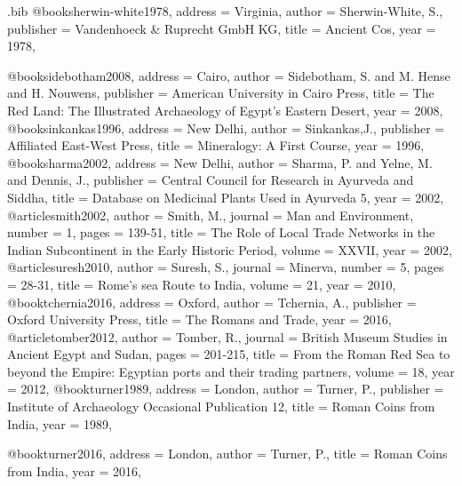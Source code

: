 \begin{filecontents}{\IJSRAidentifier.bib}
@book{sherwin-white1978,
	address = {Virginia},
	author = {Sherwin-White, S.},
	publisher = {Vandenhoeck \& Ruprecht GmbH KG},
	title = {Ancient Cos},
	year = {1978},
}

@book{sidebotham2008,
	address = {Cairo},
	author = {Sidebotham, S. and M. Hense and H. Nouwens},
	publisher = {American University in Cairo Press},
	title = {The Red Land: The Illustrated Archaeology of Egypt's Eastern Desert},
	year = {2008},
}
@book{sinkankas1996,
	address = {New Delhi},
	author = {Sinkankas,J.},
	publisher = {Affiliated East-West Press},
	title = {Mineralogy: A First Course},
	year = {1996},
}
@book{sharma2002,
	address = {New Delhi},
	author = {Sharma, P. and Yelne, M. and Dennis, J.},
	publisher = {Central Council for Research in Ayurveda and Siddha},
	title = {Database on Medicinal Plants Used in Ayurveda 5},
	year = {2002},
}
@article{smith2002,
	author = {Smith, M.},
	journal = {Man and Environment},
	number = {1},
	pages = {139-51},
	title = {The Role of Local Trade Networks in the Indian Subcontinent in the Early Historic Period},
	volume = {XXVII},
	year = {2002},
}
@article{suresh2010,
	author = {Suresh, S.},
	journal = {Minerva},
	number = {5},
	pages = {28-31},
	title = {Rome's sea Route to India},
	volume = {21},
	year = {2010},
}
@book{tchernia2016,
	address = {Oxford},
	author = {Tchernia, A.},
	publisher = {Oxford University Press},
	title = {The Romans and Trade},
	year = {2016},
}
@article{tomber2012,
	author = {Tomber, R.},
	journal = {British Museum Studies in Ancient Egypt and Sudan},
	pages = {201-215},
	title = {From the Roman Red Sea to beyond the Empire: Egyptian ports and their trading partners},
	volume = {18},
	year = {2012},
}
@book{turner1989,
	address = {London},
	author = {Turner, P.},
	publisher = {Institute of Archaeology Occasional Publication 12},
	title = {Roman Coins from India},
	year = {1989},
}

@book{turner2016,
	address = {London},
	author = {Turner, P.},
	title = {Roman Coins from India},
	year = {2016},
}


\end{filecontents}
